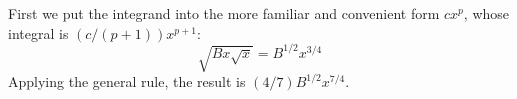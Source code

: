 First we put the integrand into the more familiar and convenient
form $cx^p$, whose integral is $(c/(p+1))x^{p+1}$:
\begin{equation*}
  \sqrt{Bx\sqrt{x}}=B^{1/2}x^{3/4}
\end{equation*}
Applying the general rule, the result is $(4/7)B^{1/2}x^{7/4}$.
